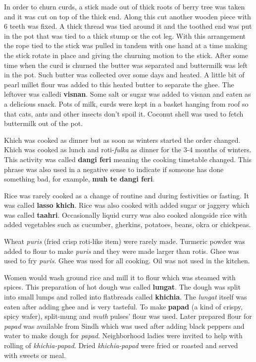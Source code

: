 In order to churn curds, a stick made out of thick roots of berry tree was
taken and it was cut on top of the thick end. Along this cut another wooden
piece with 6 teeth was fixed. A thick thread was tied around it and the toothed
end was put in the pot that was tied to a thick stump or the cot leg. With this
arrangement the rope tied to the stick was pulled in tandem with one hand at a
time making the stick rotate in place and giving the churning motion to the
stick. After some time when the curd is churned the butter was separated and
buttermilk was left in the pot. Such butter was collected over some days and
heated. A little bit of pearl millet flour was added to this heated butter to
separate the ghee. The leftover was calledi \textbf{visnan}. Some salt or sugar
was added to visnan and eaten as a delicious snack. Pots of milk, curds were
kept in a basket hanging from roof so that cats, ants and other insects don't
spoil it. Coconut shell was used to fetch buttermilk out of the pot.

Khich was cooked as dinner but as soon as winters started the order changed.
Khich was cooked as lunch and roti-\textit{fulka} as dinner for the 3-4 months
of winters. This activity was called \textbf{dangi feri} meaning the cooking
timetable changed. This phrase was also used in a negative sense to indicate if
someone has done something bad, for example, \textbf{muh te dangi feri}.

Rice was rarely cooked as a change of routine and during festivities or
fasting. It was called \textbf{lasso khich}. Rice was also cooked with added
sugar or jaggery which was called \textbf{taahri}. Occasionally liquid curry
was also cooked alongside rice with added vegetables such as cucumber,
gherkins, potatoes, beans, okra or chickpeas.

Wheat \textit{puris} (fried crisp roti-like item) were rarely made. Turmeric
powder was added to flour to make \textit{puris} and they were made larger than
rotis. Ghee was used to fry \textit{puris}. Ghee was used for all cooking. Oil
was not used in the kitchen.

Women would wash ground rice and mill it to flour which was steamed with
spices. This preparation of hot dough was called \textbf{lungat}. The dough was
split into small lumps and rolled into flatbreads called \textbf{khichia}. The
\textit{lungat} itself was eaten after adding ghee and is very tasteful. To
make \textbf{papad} (a kind of crispy, spicy wafer), split-mung and \textit{muth} pulses' flour was used.
Later prepared flour for \textit{papad} was
available from Sindh which was used after adding black peppers and
water to make dough for \textit{papad}. Neighborhood ladies were
invited to help with rolling of \textit{khichia-papad}. Dried
\textit{khichia-papad} were fried or roasted and served with sweets or
meal. 


